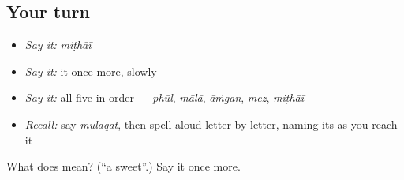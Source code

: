 \subsection*{Your turn}
\begin{itemize}
\raggedright
  \item \emph{Say it:} \emph{miṭhāī}
  \item \emph{Say it:} it once more, slowly
  \item \emph{Say it:} all five in order — \emph{phūl}, \emph{mālā}, \emph{āṁgan}, \emph{mez}, \emph{miṭhāī}
  \item \emph{Recall:} say \emph{mulāqāt}, then spell \textbf{} aloud letter by letter, naming its \textbf{} as you reach it
\end{itemize}

\begin{tcolorbox}[breakable,colback=teal!4,colframe=teal!35!black,title={Before you move on}]
What does  mean? (\textquotedblleft{}a sweet\textquotedblright{}.) Say it once more.
\end{tcolorbox}
